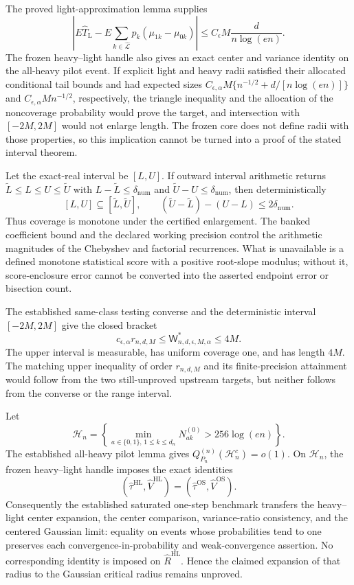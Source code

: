 The proved light-approximation lemma supplies
\[
 \left|E\widehat T_{\mathrm L}
 -E\sum_{k\in\widehat{\mathcal L}}
 p_k(\mu_{1k}-\mu_{0k})\right|
 \le C_\epsilon M\frac{d}{n\log(en)}.
\]
The frozen heavy--light handle also gives an exact center and variance
identity on the all-heavy pilot event.  If explicit light and heavy radii
satisfied their allocated conditional tail bounds and had expected sizes
\(C_{\epsilon,\alpha}M\{n^{-1/2}+d/[n\log(en)]\}\) and
\(C_{\epsilon,\alpha}Mn^{-1/2}\), respectively, the triangle inequality and
the allocation of the noncoverage probability would prove the target, and
intersection with \([-2M,2M]\) would not enlarge length.  The frozen core
does not define radii with those properties, so this implication cannot be
turned into a proof of the stated interval theorem.

Let the exact-real interval be \([L,U]\).  If outward interval arithmetic
returns \(\widetilde L\le L\le U\le\widetilde U\) with
\(L-\widetilde L\le\delta_{\mathrm{num}}\) and
\(\widetilde U-U\le\delta_{\mathrm{num}}\), then deterministically
\[
 [L,U]\subseteq[\widetilde L,\widetilde U],\qquad
 (\widetilde U-\widetilde L)-(U-L)\le2\delta_{\mathrm{num}}.
\]
Thus coverage is monotone under the certified enlargement.  The banked
coefficient bound and the declared working precision control the arithmetic
magnitudes of the Chebyshev and factorial recurrences.  What is unavailable
is a defined monotone statistical score with a positive root-slope modulus;
without it, score-enclosure error cannot be converted into the asserted
endpoint error or bisection count.

The established same-class testing converse and the deterministic interval
\([-2M,2M]\) give the closed bracket
\[
 c_{\epsilon,\alpha}r_{n,d,M}
 \le\mathsf W^*_{n,d,\epsilon,M,\alpha}\le4M.
\]
The upper interval is measurable, has uniform coverage one, and has length
\(4M\).  The matching upper inequality of order \(r_{n,d,M}\) and its
finite-precision attainment would follow from the two still-unproved upstream
targets, but neither follows from the converse or the range interval.

Let
\[
 \mathcal H_n=
 \left\{\min_{a\in\{0,1\},\,1\le k\le d_n}
 N_{ak}^{(0)}>256\log(en)\right\}.
\]
The established all-heavy pilot lemma gives
\(Q_{P_n}^{(n)}(\mathcal H_n^c)=o(1)\).  On \(\mathcal H_n\), the frozen
heavy--light handle imposes the exact identities
\[
 (\widehat\tau^{\mathrm{HL}},\widehat V^{\mathrm{HL}})
 =(\widehat\tau^{\mathrm{OS}},\widehat V^{\mathrm{OS}}).
\]
Consequently the established saturated one-step benchmark transfers the
heavy--light center expansion, the center comparison, variance-ratio
consistency, and the centered Gaussian limit: equality on events whose
probabilities tend to one preserves each convergence-in-probability and
weak-convergence assertion.  No corresponding identity is imposed on
\(\widehat R^{\mathrm{HL}}\).  Hence the claimed expansion of that radius to
the Gaussian critical radius remains unproved.

